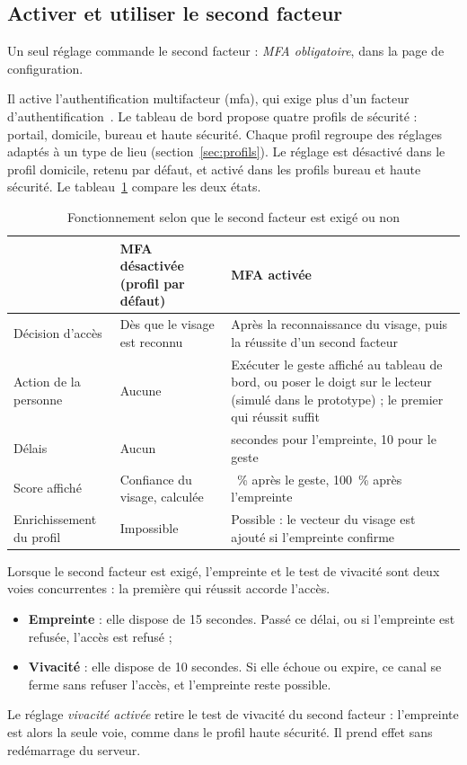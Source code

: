 \subsection{Activer et utiliser le second facteur}

Un seul réglage commande le second facteur : \emph{MFA obligatoire}, dans la page de configuration. \begin{maj}
Il active l'authentification multifacteur (\acrshort{mfa}), qui exige plus d'un facteur d'authentification~\cite{nist80063b}. Le tableau de bord propose quatre profils de sécurité : portail, domicile, bureau et haute sécurité. Chaque profil regroupe des réglages adaptés à un type de lieu (section~\ref{sec:profils}). Le réglage est désactivé dans le profil domicile, retenu par défaut, et activé dans les profils bureau et haute sécurité. Le tableau~\ref{tab:mfa} compare les deux états.
\end{maj}

\begin{table}[H]
\centering
\caption{Fonctionnement selon que le second facteur est exigé ou non}\label{tab:mfa}
\small
\begin{tabularx}{\textwidth}{@{}>{\raggedright\arraybackslash}p{3.3cm}>{\raggedright\arraybackslash}X>{\raggedright\arraybackslash}X@{}}
\toprule
 & \textbf{MFA désactivée (profil par défaut)} & \textbf{MFA activée} \\
\midrule
Décision d'accès & Dès que le visage est reconnu & Après la reconnaissance du visage, puis la réussite d'un second facteur \\
Action de la personne & Aucune & Exécuter le geste affiché au tableau de bord, ou poser le doigt sur le lecteur (simulé dans le prototype) ; le premier qui réussit suffit \\
Délais & Aucun & 15 secondes pour l'empreinte, 10 pour le geste \\
Score affiché & Confiance du visage, calculée & 85~\% après le geste, 100~\% après l'empreinte \\
Enrichissement du profil & Impossible & Possible : le vecteur du visage est ajouté si l'empreinte confirme \\
\bottomrule
\end{tabularx}
\end{table}

Lorsque le second facteur est exigé, l'empreinte et le test de vivacité sont deux voies concurrentes : la première qui réussit accorde l'accès.
\begin{itemize}
  \item \textbf{Empreinte} : elle dispose de 15 secondes. Passé ce délai, ou si l'empreinte est refusée, l'accès est refusé ;
  \item \textbf{Vivacité} : elle dispose de 10 secondes. Si elle échoue ou expire, ce canal se ferme sans refuser l'accès, et l'empreinte reste possible.
\end{itemize}
Le réglage \emph{vivacité activée} retire le test de vivacité du second facteur : l'empreinte est alors la seule voie, comme dans le profil haute sécurité. Il prend effet sans redémarrage du serveur.

